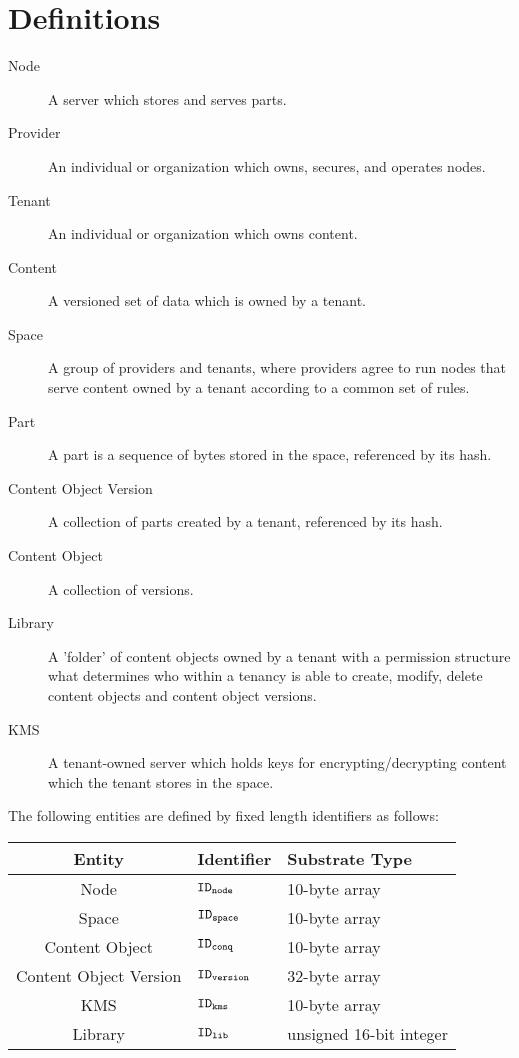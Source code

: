 \section*{Definitions}
\begin{description}
  \item[Node] A server which stores and serves parts.
  \item[Provider] An individual or organization which owns, secures, and operates nodes.
  \item[Tenant] An individual or organization which owns content.
  \item[Content] A versioned set of data which is owned by a tenant.
  \item[Space] A group of providers and tenants, where providers agree to run nodes that serve content owned by a tenant according to a common set of rules.
  \item[Part] A part is a sequence of bytes stored in the space, referenced by its hash. 
  \item[Content Object Version] A collection of parts created by a tenant, referenced by its hash.
  \item[Content Object] A collection of versions.
  \item[Library] A 'folder' of content objects owned by a tenant with a permission structure what determines who within a tenancy is able to create, modify, delete content objects and content object versions.
  \item[KMS] A tenant-owned server which holds keys for encrypting/decrypting content which the tenant stores in the space.
\end{description}

The following entities are defined by fixed length identifiers as follows:
\begin{center}
  \begin{tabular}{| c | l | l |}
    \hline
    Entity & Identifier & Substrate Type \\
    \hline 
    Node & $\mathtt{ID_{node}}$ & 10-byte array \\ %
    Space & $\mathtt{ID_{space}}$ & 10-byte array \\
    Content Object & $\mathtt{ID_{conq}}$ & 10-byte array \\
    Content Object Version & $\mathtt{ID_{version}}$ & 32-byte array \\
    KMS & $\mathtt{ID_{kms}}$ & 10-byte array \\
    Library & $\mathtt{ID_{lib}}$ & unsigned 16-bit integer \\
    \hline 
  \end{tabular}
\end{center}
